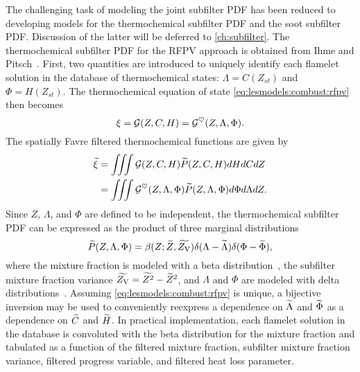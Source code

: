 The challenging task of modeling the joint subfilter PDF has been reduced to developing models for the thermochemical subfilter PDF and the soot subfilter PDF. Discussion of the latter will be deferred to \cref{ch:subfilter}. The thermochemical subfilter PDF for the RFPV approach is obtained from Ihme and Pitsch~\cite{ihme2008}. First, two quantities are introduced to uniquely identify each flamelet solution in the database of thermochemical states: $\Lambda = C(Z_{st})$ and $\Phi = H(Z_{st})$. The thermochemical equation of state \cref{eq:lesmodels:combust:rfpv} then becomes
\begin{equation}\label{eq:lesmodels:presumedpdf:eos}
  \xi = \mathcal{G}(Z, C, H) = \mathcal{G}^{\heartsuit}(Z, \Lambda, \Phi).
\end{equation}
The spatially Favre filtered thermochemical functions are given by
\begin{equation}\label{eq:lesmodels:presumedpdf:filteredeos}
  \begin{split}
    \widetilde{\xi} &= \iiint \mathcal{G}(Z,C,H)\widetilde{P}(Z,C,H) dHdCdZ \\
    &= \iiint \mathcal{G}^{\heartsuit}(Z,\Lambda,\Phi)\widetilde{P}(Z,\Lambda,\Phi) d\Phi d\Lambda dZ.
  \end{split}
\end{equation}
Since $Z$, $\Lambda$, and $\Phi$ are defined to be independent, the thermochemical subfilter PDF can be expressed as the product of three marginal distributions
\begin{equation}\label{eq:lesmodels:presumedpdf:trimarg}
  \widetilde{P}(Z,\Lambda,\Phi) = \beta(Z;\widetilde{Z},\widetilde{Z_{\text{V}}})\delta(\Lambda - \widetilde{\Lambda})\delta(\Phi - \widetilde{\Phi}),
\end{equation}
where the mixture fraction is modeled with a beta distribution~\cite{cook1994,jimenez1997,wall2000}, the subfilter mixture fraction variance $\widetilde{Z_{\text{V}}} = \widetilde{Z^2} - \widetilde{Z}^2$, and $\Lambda$ and $\Phi$ are modeled with delta distributions~\cite{ihme2008}. Assuming \cref{eq:lesmodels:combust:rfpv} is unique, a bijective inversion may be used to conveniently reexpress a dependence on $\widetilde{\Lambda}$ and $\widetilde{\Phi}$ as a dependence on $\widetilde{C}$ and $\widetilde{H}$. In practical implementation, each flamelet solution in the database is convoluted with the beta distribution for the mixture fraction and tabulated as a function of the filtered mixture fraction, subfilter mixture fraction variance, filtered progress variable, and filtered heat loss parameter.

